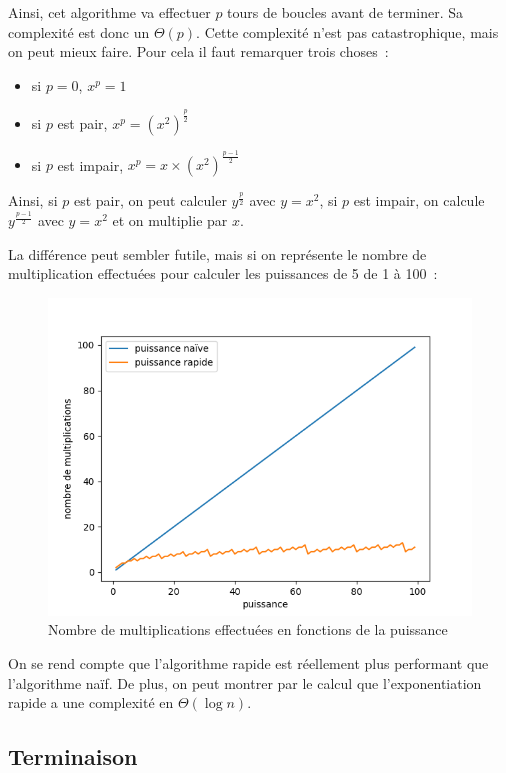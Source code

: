 		Ainsi, cet algorithme va effectuer $p$ tours de boucles avant de terminer. Sa complexité est donc un $\Theta(p)$. Cette complexité n'est pas catastrophique, mais on peut mieux faire. Pour cela il faut remarquer trois choses~:
		\begin{itemize}
			\item si $p = 0$, $x^p = 1$
			\item si $p$ est pair, $x^p = (x^2)^{\frac{p}{2}}$
			\item si $p$ est impair, $x^p = x \times (x^2)^{\frac{p - 1}{2}}$
		\end{itemize}
		
		Ainsi, si $p$ est pair, on peut calculer $y^{\frac{p}{2}}$ avec $y = x^2$, si $p$ est impair, on calcule $y^{\frac{p - 1}{2}}$ avec $y = x^2$ et on multiplie par $x$.
		
		La différence peut sembler futile, mais si on représente le nombre de multiplication effectuées pour calculer les puissances de 5 de 1 à 100~:
		\begin{figure}[htp]
			\centering
			\includegraphics[scale=0.75]{images/Figure_7.png}
			\caption{Nombre de multiplications effectuées en fonctions de la puissance}
		\end{figure}
		On se rend compte que l'algorithme rapide est réellement plus performant que l'algorithme naïf. De plus, on peut montrer par le calcul que l'exponentiation rapide a une complexité en $\Theta (\log n)$.
		
	\subsection{Terminaison}
		
